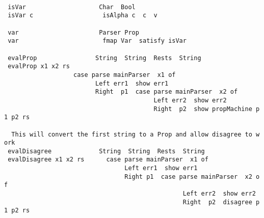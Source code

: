 \documentclass{article}
\begin{document}
\begin{tabbing}
\tt ~\\
\tt ~isVar~~~~~~~~~~~~~~~~~~~~Char~~Bool\\
\tt ~isVar~c~~~~~~~~~~~~~~~~~~~isAlpha~c~~c~~v\\
\tt ~\\
\tt ~var~~~~~~~~~~~~~~~~~~~~~~Parser~Prop\\
\tt ~var~~~~~~~~~~~~~~~~~~~~~~~fmap~Var~~satisfy~isVar\\
\tt ~\\
\tt ~evalProp~~~~~~~~~~~~~~~~String~~String~~Rests~~String\\
\tt ~evalProp~x1~x2~rs~~~~~~~~~~~\\
\tt ~~~~~~~~~~~~~~~~~~~case~parse~mainParser~~x1~of\\
\tt ~~~~~~~~~~~~~~~~~~~~~~~~~Left~err1~~show~err1\\
\tt ~~~~~~~~~~~~~~~~~~~~~~~~~Right~~p1~~case~parse~mainParser~~x2~of\\
\tt ~~~~~~~~~~~~~~~~~~~~~~~~~~~~~~~~~~~~~~~~~Left~err2~~show~err2\\
\tt ~~~~~~~~~~~~~~~~~~~~~~~~~~~~~~~~~~~~~~~~~Right~~p2~~show~propMachine~p1~p2~rs\\
\tt ~\\
\tt ~~This~will~convert~the~first~string~to~a~Prop~and~allow~disagree~to~work\\
\tt ~evalDisagree~~~~~~~~~~~~~String~~String~~Rests~~String\\
\tt ~evalDisagree~x1~x2~rs~~~~~~case~parse~mainParser~~x1~of\\
\tt ~~~~~~~~~~~~~~~~~~~~~~~~~~~~~~~~~Left~err1~~show~err1\\
\tt ~~~~~~~~~~~~~~~~~~~~~~~~~~~~~~~~~Right~p1~~case~parse~mainParser~~x2~of\\
\tt ~~~~~~~~~~~~~~~~~~~~~~~~~~~~~~~~~~~~~~~~~~~~~~~~~Left~err2~~show~err2\\
\tt ~~~~~~~~~~~~~~~~~~~~~~~~~~~~~~~~~~~~~~~~~~~~~~~~~Right~~p2~~disagree~p1~p2~rs\\

\end{tabbing}
\end{document}
